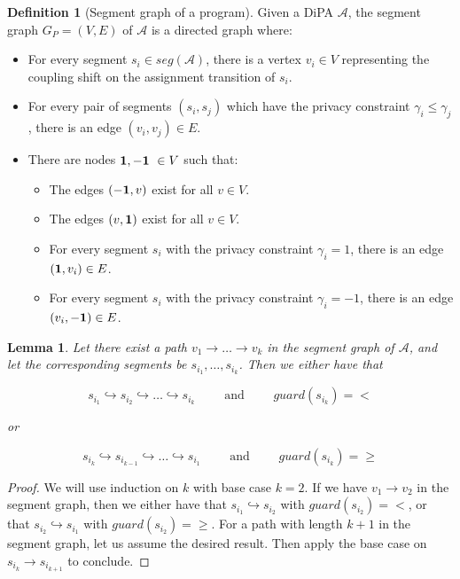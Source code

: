 \documentclass[12pt]{article}
\newtheorem{lemma}[thm]{Lemma}
\theoremstyle{definition}
\newtheorem{defn}[thm]{Definition}
\begin{document}
\begin{defn}[Segment graph of a program]
    Given a DiPA $\mathcal{A}$, the segment graph $G_P = (V, E)$ of $\mathcal{A}$ is a directed graph where: 
    \begin{itemize}
        \item For every segment $s_i \in seg(\mathcal{A})$, there is a vertex $v_i \in V$ representing the coupling shift on the assignment transition of $s_i$.
        \item For every pair of segments $(s_i, s_j)$ which have the privacy constraint $\gamma_i \leq \gamma_j$, there is an edge $(v_i, v_j) \in E$.
        \item There are nodes ${\bf 1, -1}\ \in V$ such that: 
        \begin{itemize}
            \item The edges $({\bf -1}, v)$ exist for all $v \in V$.
            \item The edges $(v, {\bf 1})$ exist for all $v \in V$.
            \item For every segment $s_i$ with the privacy constraint $\gamma_i = 1$, there is an edge $({\bf 1}, v_i) \in E$.
            \item For every segment $s_i$ with the privacy constraint $\gamma_i = -1$, there is an edge $(v_i, {\bf -1}) \in E$. 
        \end{itemize}
    \end{itemize}
\end{defn}

\begin{lemma}
    \label{lemma:segpath}
    Let there exist a path $v_1 \to \dots \to v_k$ in the segment graph of $\mathcal{A}$, and let the corresponding segments be $s_{i_1}, \dots, s_{i_k}$. Then we either have that 
    
    \[s_{i_1} \hookrightarrow s_{i_2} \hookrightarrow \dots \hookrightarrow s_{i_k} \qquad \text{ and } \qquad guard(s_{i_k}) = <\]
    
    or 
    
    \[s_{i_k} \hookrightarrow s_{i_{k - 1}} \hookrightarrow \dots \hookrightarrow s_{i_1} \qquad \text{ and } \qquad guard(s_{i_k}) = \geq\]
\end{lemma}

\begin{proof}
    We will use induction on $k$ with base case $k = 2$. If we have $v_1 \to v_2$ in the segment  graph, then we either have that $s_{i_1} \hookrightarrow s_{i_2}$ with $guard(s_{i_2}) = <$, or that $s_{i_2} \hookrightarrow s_{i_1}$ with $guard(s_{i_2}) = \geq$. For a path with length $k + 1$ in the segment  graph, let us assume the desired result. Then apply the base case on $s_{i_{k}} \to s_{i_{k + 1}}$ to conclude. 
\end{proof}
\end{document}
